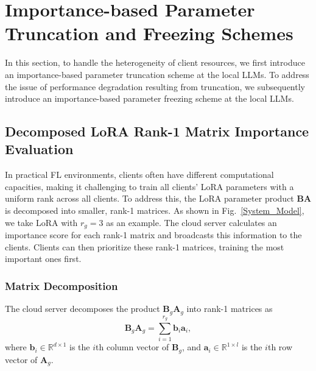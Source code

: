 \documentclass[journal]{IEEEtran}
\begin{document}
\section{Importance-based Parameter Truncation and Freezing Schemes}
In this section, to handle the heterogeneity of client resources, we first introduce an importance-based parameter truncation scheme at the local LLMs. To address the issue of performance degradation resulting from truncation, we subsequently introduce an importance-based parameter freezing scheme at the local LLMs.

\subsection{Decomposed LoRA Rank-1 Matrix Importance Evaluation}
In practical FL environments, clients often have different computational capacities, making it challenging to train all clients' LoRA parameters with a uniform rank across all clients. To address this, the LoRA parameter product \(\mathbf{B}\mathbf{A}\) is decomposed into smaller, rank-1 matrices. As shown in Fig.~\ref{System_Model}, we take LoRA with $r_g=3$ as an example. The cloud server calculates an importance score for each rank-1 matrix and broadcasts this information to the clients. Clients can then prioritize these rank-1 matrices, training the most important ones first.

\subsubsection{Matrix Decomposition}
The cloud server decomposes the product \(\mathbf{B}_g\mathbf{A}_g\) into rank-1 matrices as
\begin{equation}
\mathbf{B}_g\mathbf{A}_g = \sum_{i=1}^{r_g} \mathbf{b}_i \mathbf{a}_i,
\end{equation}
where \(\mathbf{b}_i \in \mathbb{R}^{d\times1}\) is the \(i\)th column vector of \(\mathbf{B}_g\), and \(\mathbf{a}_i \in \mathbb{R}^{1 \times l}\) is the \(i\)th row vector of \(\mathbf{A}_g\).
\end{document}
